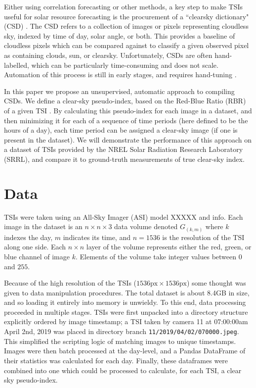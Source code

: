 \documentclass{article}
\begin{document}
Either using correlation forecasting or other methods, a key step to make TSIs useful for solar resource forecasting is the procurement of a ``clearsky dictionary" (CSD) \citep{ghonima_method_2012}. The CSD refers to a collection of images or pixels representing cloudless sky, indexed by time of day, solar angle, or both. This provides a baseline of cloudless pixels which can be compared against to classify a given observed pixel as containing clouds, sun, or clearsky. Unfortunately, CSDs are often hand-labelled, which can be particularly time-consuming and does not scale. Automation of this process is still in early stages, and requires hand-tuning \citep{pawar_detecting_2019}.

In this paper we propose an unsupervised, automatic approach to compiling CSDs. We define a clear-sky pseudo-index, based on the Red-Blue Ratio (RBR) of a given TSI \citep{dev_rough-set-based_2017}. By calculating this pseudo-index for each image in a dataset, and then minimizing it for each of a sequence of time periods (here defined to be the hours of a day), each time period can be assigned a clear-sky image (if one is present in the dataset). We will demonstrate the performance of this approach on a dataset of TSIs provided by the NREL Solar Radiation Research Laboratory (SRRL), and compare it to ground-truth measurements of true clear-sky index. 


\section{Data}
TSIs were taken using an All-Sky Imager (ASI) {\color{red}model XXXXX and info}.  Each image in the dataset is an $n \times n \times 3$ data volume denoted $G_{(k,m)}$ where $k$ indexes the day, $m$ indicates its time, and $n=1536$ is the resolution of the TSI along one side. Each $n \times n$ layer of the volume represents either the red, green, or blue channel of image $k$. Elements of the volume take integer values between $0$ and $255$.

Because of the high resolution of the TSIs ($1536\text{px} \times 1536\text{px}$) some thought was given to data manipulation procedures. The total dataset is about 8.4GB in size, and so loading it entirely into memory is unwieldy. To this end, data processing proceeded in multiple stages. TSIs were first unpacked into a directory structure explicitly ordered by image timestamp; a  TSI taken by camera 11 at 07:00:00am April 2nd, 2019 was placed in directory branch \texttt{11/2019/04/02/070000.jpeg}. This simplified the scripting logic of matching images to unique timestamps. Images were then batch processed at the day-level, and a Pandas DataFrame of their statistics was calculated for each day. Finally, these dataframes were combined into one which could be processed to calculate, for each TSI, a clear sky pseudo-index.
\end{document}
